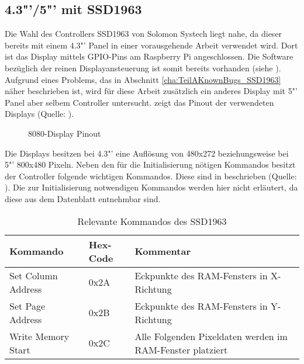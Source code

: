 \subsection{4.3"'/5"' mit SSD1963}
Die Wahl des Controllers SSD1963 von Solomon Systech liegt nahe, da dieser bereits mit einem 4.3"'  Panel in einer vorausgehende Arbeit verwendet wird. Dort ist das Display mittels GPIO-Pins am Raspberry Pi angeschlossen. Die Software bezüglich der reinen Displayansteuerung ist somit bereits vorhanden (siehe \cite{Schlegel2013a}). Aufgrund eines Problems, das in Abschnitt \ref{cha:TeilAKnownBugs_SSD1963} näher beschrieben ist, wird für diese Arbeit zusätzlich ein anderes Display mit 5"' Panel aber selbem Controller untersucht. 
 zeigt das Pinout der verwendeten Displays (Quelle: \cite{Coldtears2014}).
\begin{figure}[h]
	\centering
{}
	\caption{8080-Display Pinout}
	\label{fig:8080_pinout}
\end{figure}
Die Displays besitzen bei 4.3"' eine Auflösung von 480x272 beziehungsweise bei 5"' 800x480 Pixeln. Neben den für die Initialisierung nötigen Kommandos besitzt der Controller folgende wichtigen Kommandos. Diese sind in  beschrieben (Quelle:  \cite{SSD2008}). Die zur Initialisierung notwendigen Kommandos werden hier nicht erläutert, da diese aus dem Datenblatt entnehmbar sind.
\begin{table}[h]
\begin{tabular}{|p{4cm}|p{1cm}|p{8cm}|}\hline
\rowcolor{TableBackgroundColor} 
   \textbf{Kommando} & \textbf{Hex-Code} & \textbf{Kommentar}\\ \hline
   Set Column Address & 0x2A & Eckpunkte des RAM-Fensters in X-Richtung \\ \hline
   Set Page Address & 0x2B & Eckpunkte des RAM-Fensters in Y-Richtung \\ \hline
   Write Memory Start & 0x2C & Alle Folgenden Pixeldaten werden im RAM-Fenster platziert \\ \hline
\end{tabular}
\caption{Relevante Kommandos des SSD1963}
\label{tab:Kommandos_SSD1963}
\end{table}


